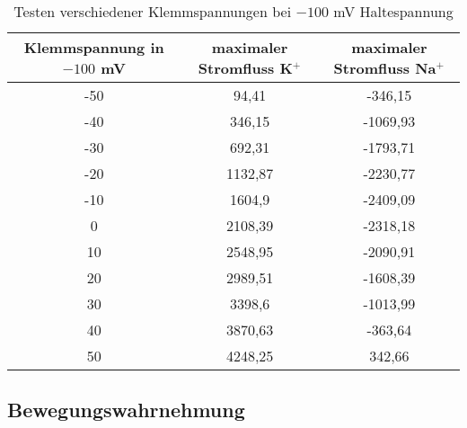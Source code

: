 \documentclass[11pt]{article}
\begin{document}
\begin{table}[H]
\caption{Testen verschiedener Klemmspannungen bei $-100$ mV Haltespannung}
\centering
\begin{adjustbox}{width=1.3\textwidth, center=\textwidth}
\begin{tabular}{c|c|c}
Klemmspannung in $-100$ mV & maximaler Stromfluss K$^+$ & maximaler Stromfluss Na$^+$\\
\hline\hline
-50	&	94,41	&	-346,15	\\
-40	&	346,15	&	-1069,93	\\
-30	&	692,31	&	-1793,71	\\
-20	&	1132,87	&	-2230,77	\\
-10	&	1604,9	&	-2409,09	\\
0	&	2108,39	&	-2318,18	\\
10	&	2548,95	&	-2090,91	\\
20	&	2989,51	&	-1608,39	\\
30	&	3398,6	&	-1013,99	\\
40	&	3870,63	&	-363,64	\\
50	&	4248,25	&	342,66	
\end{tabular}
\end{adjustbox}
\label{werte}
\end{table}


\subsection{Bewegungswahrnehmung}
\end{document}
